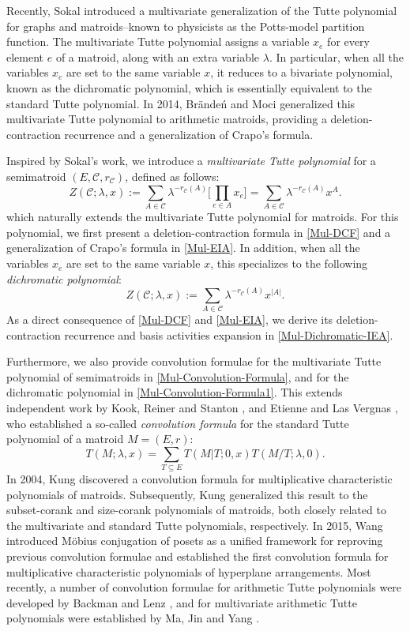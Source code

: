 \documentclass[12pt]{article}%
\renewcommand*{\bm}[1]{#1}%
\numberwithin{equation}{section}
\begin{document}
Recently, Sokal \cite{Sokal2005} introduced a multivariate generalization of the Tutte polynomial for graphs and matroids--known to physicists as the Potts-model partition function. The multivariate Tutte polynomial assigns a variable $x_e$ for every element $e$ of a matroid, along with an extra variable $\lambda$. In particular, when all the variables $x_e$  are set to the same variable $x$,  it reduces to a bivariate polynomial, known as the dichromatic polynomial, which is essentially equivalent to the standard Tutte polynomial. In 2014, Br\"ande\'n and Moci \cite{BM2014} generalized this multivariate Tutte polynomial to arithmetic matroids, providing a deletion-contraction recurrence and a generalization of Crapo's formula. 

Inspired by Sokal's work, we introduce a {\em multivariate Tutte polynomial} for a semimatroid $(E,\mathcal{C},r_\mathcal{C})$, defined as follows:
\[
Z(\mathcal{C};\lambda,\bm x):=\sum_{A\in\mathcal{C}}\lambda^{-r_\mathcal{C}(A)}\Big[\prod_{e\in A}x_e\Big]=\sum_{A\in\mathcal{C}}\lambda^{-r_\mathcal{C}(A)}\bm x^A.
\]
which naturally extends the multivariate Tutte polynomial for matroids. For this polynomial, we first present a deletion-contraction formula in \autoref{Mul-DCF} and a generalization of  Crapo's formula in \autoref{Mul-EIA}. In addition, when all the variables $x_e$  are set to the same variable $x$, this specializes to the following {\em dichromatic polynomial}:
\[
Z(\mathcal{C};\lambda,x):=\sum_{A\in\mathcal{C}}\lambda^{-r_\mathcal{C}(A)}x^{|A|}.
\]
As a direct consequence of  \autoref{Mul-DCF} and  \autoref{Mul-EIA}, we derive its deletion-contraction recurrence and basis activities expansion in \autoref{Mul-Dichromatic-IEA}.

Furthermore, we also provide convolution formulae for the multivariate Tutte polynomial of semimatroids in \autoref{Mul-Convolution-Formula}, and for the dichromatic polynomial in \autoref{Mul-Convolution-Formula1}. This extends independent work by Kook, Reiner and Stanton \cite{KRS1999}, and Etienne and Las Vergnas \cite{EL1998}, who established a so-called {\em convolution formula} for the standard Tutte polynomial of a matroid $M=(E,r)$:
\begin{equation}\label{Convolution-Formula}
T(M;\lambda,x)=\sum_{T\subseteq E}T(M|T;0,x)T(M/T;\lambda,0).
\end{equation}
In 2004, Kung discovered a convolution formula for multiplicative characteristic polynomials of matroids. Subsequently, Kung \cite{Kung2010} generalized this result to the subset-corank and size-corank polynomials of matroids, both closely related to the multivariate and standard Tutte polynomials, respectively. In 2015, Wang \cite{Wang2015} introduced M\"obius conjugation of posets as a unified framework for reproving previous convolution formulae and established the first convolution formula for multiplicative characteristic polynomials of hyperplane arrangements. Most recently, a number of convolution formulae for arithmetic Tutte polynomials were developed by Backman and Lenz \cite{BL2017}, and for multivariate arithmetic Tutte polynomials were established by Ma, Jin and Yang \cite{MJY2024}.
\end{document}
